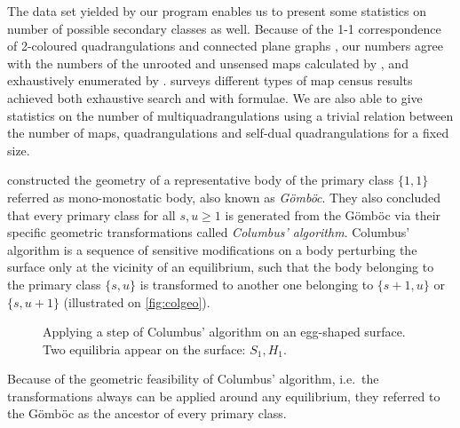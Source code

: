 \documentclass[]{article}
\newcommand{\Gomboc}{Gömböc\xspace}
\begin{document}
The data set yielded by our program enables us to present some statistics on number of possible secondary classes as well.
Because of the 1-1 correspondence of 2-coloured quadrangulations and connected plane graphs \cite{Fusy2007,Brinkmann2005}, our numbers agree with the numbers of the unrooted and unsensed maps calculated by \citet{Wormald1981}, and exhaustively enumerated by \citet{Walsh1983, Walsh2012}.
\citet{Walsh2007} surveys different types of map census results achieved both exhaustive search and with formulae.
We are also able to give statistics on the number of multiquadrangulations using a trivial relation between the number of maps, quadrangulations  and self-dual quadrangulations for a fixed size.


\citet{Domokos2006} constructed the geometry of a representative body of the primary class $\{1,1\}$ referred as mono-monostatic body, also known as \emph{Gömböc}.
They also concluded that every primary class for all $s,u\geq 1$ is generated from the \Gomboc via their specific geometric transformations called \emph{Columbus' algorithm}. Columbus' algorithm is a sequence of sensitive modifications on a body perturbing the surface only at the vicinity of an equilibrium, such that the body belonging to the primary class $\{s,u\}$ is transformed to another one belonging to $\{s+1,u\}$ or $\{s,u+1\}$ (illustrated on \autoref{fig:colgeo}).
\begin{figure}\centering
  \qquad
\caption{Applying a step of Columbus' algorithm on an egg-shaped surface.
Two equilibria appear on the surface: $S_1, H_1$.}
  \label{fig:colgeo}
\end{figure}
Because of the geometric feasibility of Columbus' algorithm, i.e.~the transformations always can be applied around any equilibrium, they referred to the \Gomboc as the ancestor of every primary class.
\end{document}
